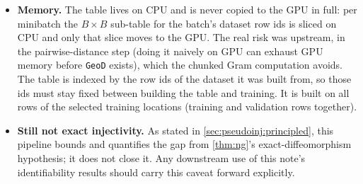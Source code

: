 \begin{itemize}[leftmargin=1.5em]
\begin{itemize}[leftmargin=1.3em]
            (embarrassingly parallel). The weights are non-negative, so plain Dijkstra is the right
            choice; Johnson's algorithm exists for negative weights and has no advantage here.
      \item \emph{Storage modes.} \texttt{"full"}: the exact $N\times N$ table ($\sim\!1.3$GB in float32,
            $\sim\!650$MB in float16, which is acceptable because geodesic distances are a regularization
            target, optionally a disk memmap). \texttt{"landmark"}: only an $L\times N$ table from $L$
            random landmarks ($L=2000$: $\sim\!144$MB), with the sub-table approximated as
            $D_{ij}\approx\min_l\bigl(d(l,i)+d(l,j)\bigr)$. This is an \emph{upper bound}: exact when $i$
            or $j$ is a landmark or lies on a shortest path through one, and otherwise an overestimate
            (triangle inequality). An overestimated $D$ lowers the latent/geodesic ratio in the injective
            loss and so biases it toward pushing pairs apart; prefer \texttt{"full"} when $N^2$ fits
            in RAM.
      \end{itemize}
\item \textbf{Memory.} The table lives on CPU and is never copied to the GPU in full: per minibatch the
      $B\times B$ sub-table for the batch's dataset row ids is sliced on CPU and only that slice moves to
      the GPU. The real risk was upstream, in the pairwise-distance step (doing it naively on GPU can
      exhaust GPU memory before \texttt{GeoD} exists), which the chunked Gram computation avoids. The
      table is indexed by the row ids of the dataset it was built from, so those ids must stay fixed
      between building the table and training. It is built on all rows of the selected training
      locations (training and validation rows together).
\item \textbf{Still not exact injectivity.} As stated in \cref{sec:pseudoinj:principled}, this pipeline
      bounds and quantifies the gap from \cref{thm:ng}'s exact-diffeomorphism hypothesis; it does not
      close it. Any downstream use of this note's identifiability results should carry this caveat forward
      explicitly.
\end{itemize}
